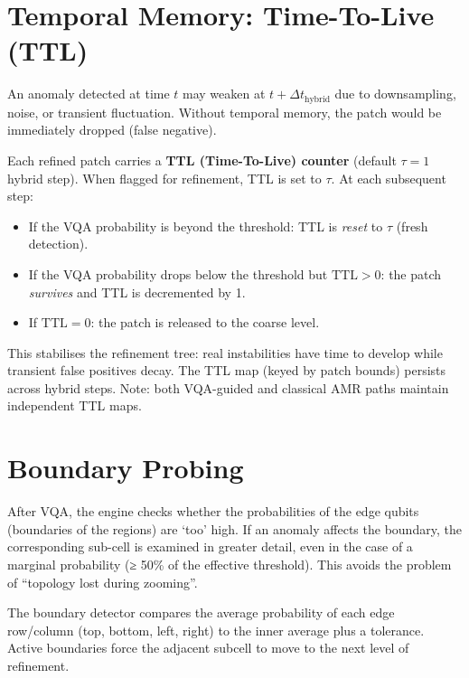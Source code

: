 \documentclass[12pt, a4paper, oneside]{report}
\begin{document}
\section{Temporal Memory: Time-To-Live (TTL)}

An anomaly detected at time $t$ may weaken at $t + \Delta t_{\text{hybrid}}$ due to downsampling, noise, or transient fluctuation. Without temporal memory, the patch would be immediately dropped (false negative).

Each refined patch carries a \textbf{TTL (Time-To-Live) counter} (default $\tau = 1$ hybrid step). When flagged for refinement, TTL is set to $\tau$. At each subsequent step:
\begin{itemize}
    \item If the VQA probability is beyond the threshold: TTL is \textit{reset} to $\tau$ (fresh detection).
    \item If the VQA probability drops below the threshold but $\text{TTL} > 0$: the patch \textit{survives} and TTL is decremented by 1.
    \item If $\text{TTL} = 0$: the patch is released to the coarse level.
\end{itemize}
This stabilises the refinement tree: real instabilities have time to develop while transient false positives decay. The TTL map (keyed by patch bounds) persists across hybrid steps. Note: both VQA-guided and classical AMR paths maintain independent TTL maps.

\section{Boundary Probing}

After VQA, the engine checks whether the probabilities of the edge qubits (boundaries of the regions) are ‘too’ high. If an anomaly affects the boundary, the corresponding sub-cell is examined in greater detail, even in the case of a marginal probability (≥ 50\% of the effective threshold). This avoids the problem of “topology lost during zooming”.

The boundary detector compares the average probability of each edge row/column (top, bottom, left, right) to the inner average plus a tolerance. Active boundaries force the adjacent subcell to move to the next level of refinement.
\end{document}
